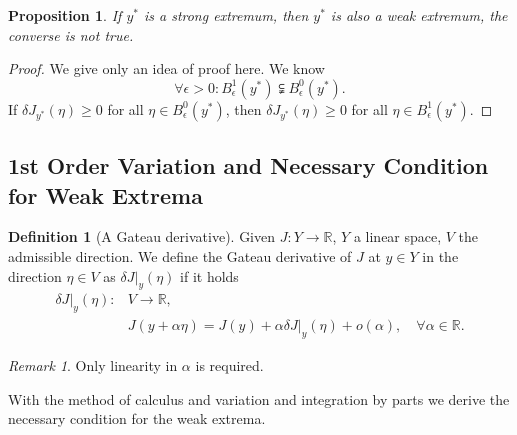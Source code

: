 \documentclass[a4paper,11pt,fleqn]{book}
\newtheorem{proposition}[theorem]{Proposition}
\theoremstyle{definition}
\newtheorem{definition}{Definition}[section]
\theoremstyle{remark}
\newtheorem*{remark}{Remark}
\begin{document}
\begin{proposition}
	If $y^*$ is a strong extremum, then $y^*$ is also a weak extremum, the converse is not true.
\end{proposition}
\begin{proof}
	We give only an idea of proof here. We know
	\begin{equation}
		\forall \epsilon > 0: B_\epsilon^1(y^*) \subsetneqq B^0_\epsilon(y^*).
	\end{equation}
	If $\delta J_{y^*}(\eta) \ge 0$ for all $\eta \in B_\epsilon^0(y^*)$, then $\delta J_{y^*}(\eta) \ge 0$ for all $\eta \in B_\epsilon^1(y^*)$. 
\end{proof}


\subsection{1st Order Variation and Necessary Condition for Weak Extrema}
\begin{definition}[A Gateau derivative]
Given $J: Y \rightarrow \mathbb{R} $, $Y$ a linear space, $V$ the admissible direction. We define the Gateau derivative of $J$ at $y \in Y$ in the direction $\eta \in V$ as $\delta J|_y(\eta)$ if it holds
\begin{equation}
\begin{aligned}
	 \delta J|_y(\eta):  & V \rightarrow \mathbb{R},   \\
	& J(y + \alpha \eta) = J(y) + \alpha \delta J|_y(\eta) + o(\alpha), \quad \forall \alpha \in \mathbb{R}.
\end{aligned}
\end{equation} 
\end{definition}
\begin{remark}
Only linearity in $\alpha$ is required. 	
\end{remark}


With the method of calculus and variation and integration by parts we derive the necessary condition for the weak extrema. 
\end{document}
